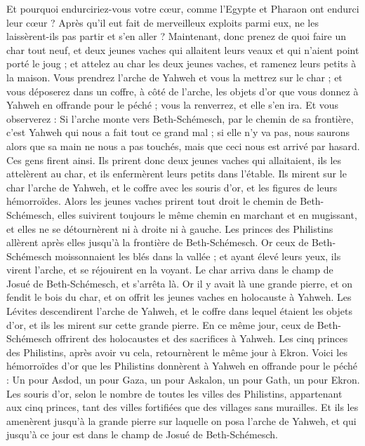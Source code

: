 \begin{multicols}{2}
Et pourquoi endurciriez-vous votre cœur, comme l'Egypte et Pharaon ont endurci leur cœur ? Après qu'il eut fait de merveilleux exploits parmi eux, ne les laissèrent-ils pas partir et s’en aller ?
Maintenant, donc prenez de quoi faire un char tout neuf, et deux jeunes vaches qui allaitent leurs veaux et qui n’aient point porté le joug ; et attelez au char les deux jeunes vaches, et ramenez leurs petits à la maison.
Vous prendrez l'arche de Yahweh et vous la mettrez sur le char ; et vous déposerez dans un coffre, à côté de l’arche, les objets d'or que vous donnez à Yahweh en offrande pour le péché ; vous la renverrez, et elle s'en ira.
Et vous observerez : Si l'arche monte vers Beth-Schémesch, par le chemin de sa frontière, c'est Yahweh qui nous a fait tout ce grand mal ; si elle n'y va pas, nous saurons alors que sa main ne nous a pas touchés, mais que ceci nous est arrivé par hasard.
Ces gens firent ainsi. Ils prirent donc deux jeunes vaches qui allaitaient, ils les attelèrent au char, et ils enfermèrent leurs petits dans l'étable.
Ils mirent sur le char l'arche de Yahweh, et le coffre avec les souris d'or, et les figures de leurs hémorroïdes.
Alors les jeunes vaches prirent tout droit le chemin de Beth-Schémesch, elles suivirent toujours le même chemin en marchant et en mugissant, et elles ne se détournèrent ni à droite ni à gauche. Les princes des Philistins allèrent après elles jusqu'à la frontière de Beth-Schémesch.
Or ceux de Beth-Schémesch moissonnaient les blés dans la vallée ; et ayant élevé leurs yeux, ils virent l'arche, et se réjouirent en la voyant.
Le char arriva dans le champ de Josué de Beth-Schémesch, et s'arrêta là. Or il y avait là une grande pierre, et on fendit le bois du char, et on offrit les jeunes vaches en holocauste à Yahweh.
Les Lévites descendirent l'arche de Yahweh, et le coffre dans lequel étaient les objets d'or, et ils les mirent sur cette grande pierre. En ce même jour, ceux de Beth-Schémesch offrirent des holocaustes et des sacrifices à Yahweh.
Les cinq princes des Philistins, après avoir vu cela, retournèrent le même jour à Ekron.
Voici les hémorroïdes d'or que les Philistins donnèrent à Yahweh en offrande pour le péché : Un pour Asdod, un pour Gaza, un pour Askalon, un pour Gath, un pour Ekron.
Les souris d’or, selon le nombre de toutes les villes des Philistins, appartenant aux cinq princes, tant des villes fortifiées que des villages sans murailles. Et ils les amenèrent jusqu'à la grande pierre sur laquelle on posa l'arche de Yahweh, et qui jusqu'à ce jour est dans le champ de Josué de Beth-Schémesch.

\end{multicols}

